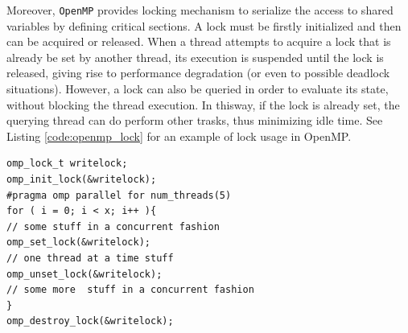 \begin{description}
Moreover, \texttt{OpenMP} provides locking mechanism to serialize the access to shared variables by defining critical sections.
A lock must be firstly  initialized and then can be acquired or released.
When a thread  attempts to acquire a lock that is already be set by another
thread, its execution is suspended until the lock is released,
giving rise to performance degradation (or even to possible deadlock situations). 
However, a lock can also be queried in order to evaluate its state, without blocking the thread execution.
In thisway, if the lock is already set, the querying thread can do
perform other trasks, thus minimizing idle time.
See Listing \ref{code:openmp_lock} for an example of lock usage in OpenMP.
\begin{minipage}{1.0\textwidth}
\begin{lstlisting}
omp_lock_t writelock;
omp_init_lock(&writelock);
#pragma omp parallel for num_threads(5)
for ( i = 0; i < x; i++ ){
// some stuff in a concurrent fashion
omp_set_lock(&writelock);
// one thread at a time stuff
omp_unset_lock(&writelock);
// some more  stuff in a concurrent fashion
}    
omp_destroy_lock(&writelock);
\end{lstlisting}
\end{minipage}   


\end{description}
